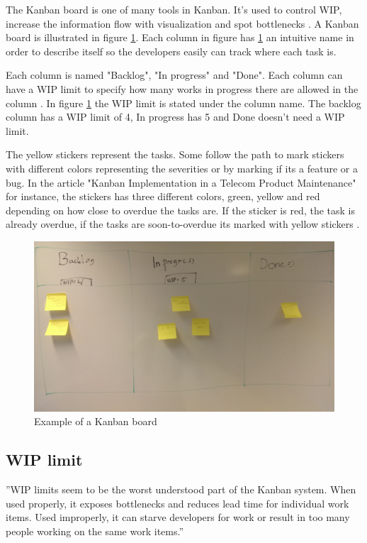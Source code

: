\documentclass[UKenglish]{ifimaster}  %
\begin{document}
The Kanban board is one of many tools in Kanban. It's used to control WIP, increase the information flow with visualization and spot bottlenecks \parencite{SMR:SMR1599}. A Kanban board is illustrated in figure \ref{kanban_board}. Each column in figure has \ref{kanban_board} an intuitive name in order to describe itself so the developers easily can track where each task is. 

Each column is named "Backlog", "In progress" and "Done".  Each column can have a WIP limit to specify how many works in progress there are allowed in the column \parencite{Joyce}. In figure \ref{kanban_board} the WIP limit is stated under the column name. The backlog column has a WIP limit of 4, In progress has 5 and Done doesn't need a WIP limit. 

The yellow stickers represent the tasks. Some follow the path to mark stickers with different colors representing the severities or by marking if its a feature or a bug. In the article "Kanban Implementation in a Telecom Product Maintenance" for instance, the stickers has three different colors, green, yellow and red depending on how close to overdue the tasks are. If the sticker is red, the task is already overdue, if the tasks are soon-to-overdue its marked with yellow stickers \parencite{6068363}.
\begin{figure}[!htbp]
\centering
\includegraphics[width=\textwidth]{Picture/kanban_board.jpg}
\caption{Example of a Kanban board}
\label{kanban_board}
\end{figure}

\subsection{WIP limit}
\label{WIPsec}
''WIP limits seem to be the worst understood part of the Kanban system. When used properly, it exposes bottlenecks and reduces lead time for individual work items. Used improperly, it can starve developers for work or result in too many people working on the same work items.'' \parencite{Shinkle}
\end{document}
